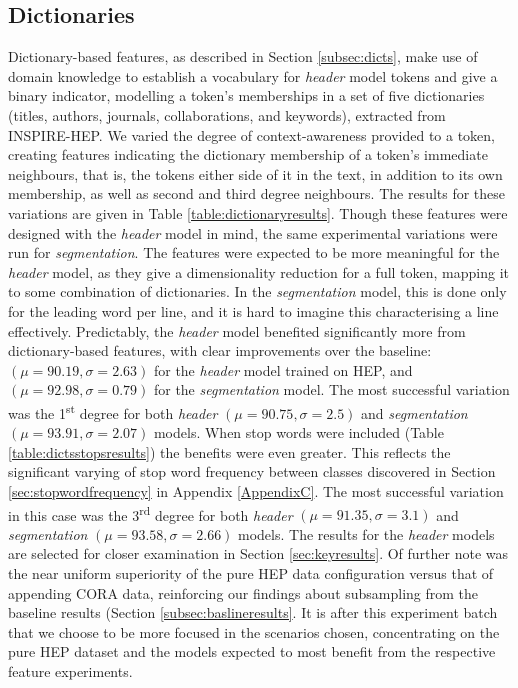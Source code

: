 \subsection{Dictionaries}
\label{subsec:dictionaries}
Dictionary-based features, as described in Section \ref{subsec:dicts}, make use of domain knowledge to establish a vocabulary for \emph{header} model tokens and give a binary indicator, modelling a token's memberships in a set of five dictionaries (titles, authors, journals, collaborations, and keywords), extracted from INSPIRE-HEP. We varied the degree of context-awareness provided to a token, creating features indicating the dictionary membership of a token's immediate neighbours, that is, the tokens either side of it in the text, in addition to its own membership, as well as second and third degree neighbours. The results for these variations are given in Table \ref{table:dictionaryresults}. Though these features were designed with the \emph{header} model in mind, the same experimental variations were run for \emph{segmentation}. The features were expected to be more meaningful for the \emph{header} model, as they give a dimensionality reduction for a full token, mapping it to some combination of dictionaries. In the \emph{segmentation} model, this is done only for the leading word per line, and it is hard to imagine this characterising a line effectively. Predictably, the \emph{header} model benefited significantly more from dictionary-based features, with clear improvements over the baseline: $(\mu =  90.19, \sigma = 2.63)$ for the \emph{header} model trained on HEP, and $(\mu =  92.98, \sigma = 0.79)$ for the \emph{segmentation} model. The most successful variation was the 1\textsuperscript{st} degree for both \emph{header} $(\mu = 90.75, \sigma = 2.5)$ and \emph{segmentation} $(\mu = 93.91, \sigma = 2.07)$ models. When stop words were included (Table \ref{table:dictsstopsresults}) the benefits were even greater. This reflects the significant varying of stop word frequency between classes discovered in Section \ref{sec:stopwordfrequency} in Appendix \ref{AppendixC}. The most successful variation in this case was the 3\textsuperscript{rd} degree for both \emph{header} $(\mu = 91.35, \sigma = 3.1)$ and \emph{segmentation} $(\mu = 93.58, \sigma = 2.66)$ models. The results for the \emph{header} models are selected for closer examination in Section \ref{sec:keyresults}. Of further note was the near uniform superiority of the pure HEP data configuration versus that of appending CORA data, reinforcing our findings about subsampling from the baseline results (Section \ref{subsec:baslineresults}. It is after this experiment batch that we choose to be more focused in the scenarios chosen, concentrating on the pure HEP dataset and the models expected to most benefit from the respective feature experiments.

